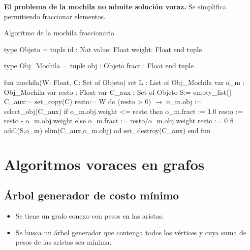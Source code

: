 \textbf{El problema de la mochila no admite solución voraz.} Se simplifica permitiendo fraccionar elementos.

\begin{codebox}{Algoritmo de la mochila fraccionaria}
\begin{pascallike}
type Objeto = tuple
                id : Nat
                value: Float
                weight: Float
            end tuple

type Obj_Mochila = tuple
                    obj : Objeto
                    fract : Float
                end tuple

fun mochila(W: Float, C: Set of Objeto) ret L : List of Obj_Mochila
    var o_m : Obj_Mochila var resto : Float
    var C_aux : Set of Objeto
    S:= empty_list()
    C_aux:= set_copy(C)
    resto:= W
    do (resto > 0) $\rightarrow$
        o_m.obj := select_obj(C_aux)
        if o_m.obj.weight <= resto
            then o_m.fract := 1.0
                resto := resto - o_m.obj.weight
            else o_m.fract := resto/o_m.obj.weight
                resto := 0
        fi
        addl(S,o_m)
        elim(C_aux,o_m.obj)
    od
    set_destroy(C_aux)
end fun
\end{pascallike}
\end{codebox}

\section{Algoritmos voraces en grafos}

\subsection{Árbol generador de costo mínimo}

\begin{itemize}
    \item Se tiene un grafo conexo con pesos en las aristas.
    \item Se busca un árbol generador que contenga todos los vértices y cuya suma de pesos de las aristas sea mínima.
\end{itemize}

